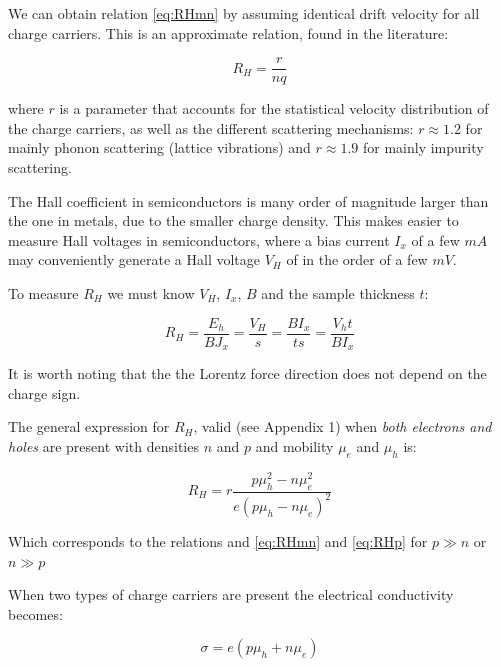 \documentclass[]{book}
\begin{document}
We can obtain relation \eqref{eq:RHmn} by assuming identical drift
velocity for all charge carriers. This is an approximate relation, found
in the literature:

\begin{equation}
 R_H = \frac{r}{nq}
\label{eq:foundInLiterature}
\end{equation}

where \(r\) is a parameter that accounts for the statistical velocity
distribution of the charge carriers, as well as the different scattering
mechanisms: \(r\approx 1.2\) for mainly phonon scattering (lattice
vibrations) and \(r\approx 1.9\) for mainly impurity scattering.

The Hall coefficient in semiconductors is many order of magnitude larger
than the one in metals, due to the smaller charge density. This makes
easier to measure Hall voltages in semiconductors, where a bias current
\(I_x\) of a few \(mA\) may conveniently generate a Hall voltage \(V_H\)
of in the order of a few \(mV\).

To measure \(R_H\) we must know \(V_H\), \(I_x\), \(B\) and the sample
thickness \(t\):

\begin{equation}
 R_{ H }=\frac { E_{ h } }{ B{ J }_{ x } } =\frac { V_{ H } }{ s } =\frac { B{ I }_{ x } }{ ts } =\frac { V_{ h }t }{ B{ I }_{ x } } 
\label{eq:Rh}
\end{equation}

It is worth noting that the the Lorentz force direction does not depend
on the charge sign.

The general expression for \(R_H\), valid (see Appendix 1) when
\emph{both electrons and holes} are present with densities \(n\) and
\(p\) and mobility \(\mu_e\) and \(\mu_h\) is:

\begin{equation}
 R_{ H }=r\frac { p\mu ^{ 2 }_{ h }-n\mu ^{ 2 }_{ e } }{ e(p\mu _{ h }-n\mu _{ e })^{ 2 } } 
\label{eq:RhGeneralExpression}
\end{equation}

Which corresponds to the relations and \eqref{eq:RHmn} and \eqref{eq:RHp}
for \(p\gg n\) or \(n\gg p\)

When two types of charge carriers are present the electrical
conductivity becomes:

\begin{equation}
\sigma =e(p \mu_h + n \mu_e)
\label{eq:electricalConductivity2Carriers}
\end{equation}
\end{document}
